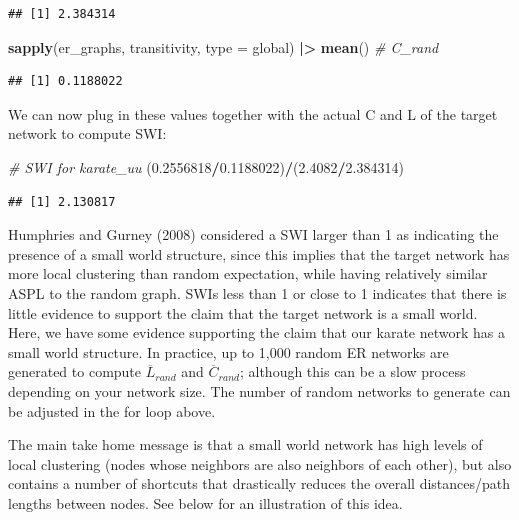 \documentclass[
]{book}
\newenvironment{Shaded}{\begin{snugshade}}{\end{snugshade}}
\newcommand{\AttributeTok}[1]{\textcolor[rgb]{0.13,0.29,0.53}{#1}}
\newcommand{\CommentTok}[1]{\textcolor[rgb]{0.56,0.35,0.01}{\textit{#1}}}
\newcommand{\FloatTok}[1]{\textcolor[rgb]{0.00,0.00,0.81}{#1}}
\newcommand{\FunctionTok}[1]{\textcolor[rgb]{0.13,0.29,0.53}{\textbf{#1}}}
\newcommand{\NormalTok}[1]{#1}
\newcommand{\SpecialCharTok}[1]{\textcolor[rgb]{0.81,0.36,0.00}{\textbf{#1}}}
\newcommand{\StringTok}[1]{\textcolor[rgb]{0.31,0.60,0.02}{#1}}
\begin{document}
\begin{verbatim}
## [1] 2.384314
\end{verbatim}

\begin{Shaded}
\begin{Highlighting}[]
\FunctionTok{sapply}\NormalTok{(er\_graphs, transitivity, }\AttributeTok{type =} \StringTok{\textquotesingle{}global\textquotesingle{}}\NormalTok{) }\SpecialCharTok{|\textgreater{}} \FunctionTok{mean}\NormalTok{() }\CommentTok{\# C\_rand}
\end{Highlighting}
\end{Shaded}

\begin{verbatim}
## [1] 0.1188022
\end{verbatim}

We can now plug in these values together with the actual C and L of the target network to compute SWI:

\begin{Shaded}
\begin{Highlighting}[]
\CommentTok{\# SWI for karate\_uu }
\NormalTok{(}\FloatTok{0.2556818}\SpecialCharTok{/}\FloatTok{0.1188022}\NormalTok{)}\SpecialCharTok{/}\NormalTok{(}\FloatTok{2.4082}\SpecialCharTok{/}\FloatTok{2.384314}\NormalTok{)}
\end{Highlighting}
\end{Shaded}

\begin{verbatim}
## [1] 2.130817
\end{verbatim}

Humphries and Gurney (2008) considered a SWI larger than 1 as indicating the presence of a small world structure, since this implies that the target network has more local clustering than random expectation, while having relatively similar ASPL to the random graph. SWIs less than 1 or close to 1 indicates that there is little evidence to support the claim that the target network is a small world. Here, we have some evidence supporting the claim that our karate network has a small world structure. In practice, up to 1,000 random ER networks are generated to compute \(\overline L_{rand}\) and \(\overline C_{rand}\); although this can be a slow process depending on your network size. The number of random networks to generate can be adjusted in the for loop above.

The main take home message is that a small world network has high levels of local clustering (nodes whose neighbors are also neighbors of each other), but also contains a number of shortcuts that drastically reduces the overall distances/path lengths between nodes. See below for an illustration of this idea.
\end{document}
